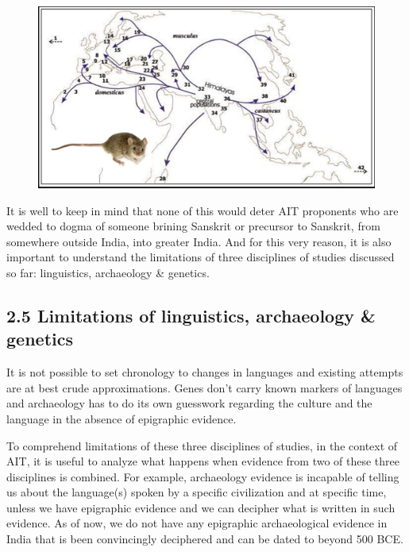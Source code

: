 \begin{figure}[!htbp]
\includegraphics[scale=0.22]{"images/8-11.jpg"}
\caption{}\label{art8-fig11}
\end{figure}

\newpage

It is well to keep in mind that none of this would deter AIT proponents who are wedded to dogma of someone brining Sanskrit or precursor to Sanskrit, from somewhere outside India, into greater India. And for this very reason, it is also important to understand the limitations of three disciplines of studies discussed so far: linguistics, archaeology \& genetics.


\subsection*{2.5 Limitations of linguistics, archaeology \& genetics}

It is not possible to set chronology to changes in languages and existing attempts are at best crude approximations. Genes don’t carry known markers of languages and archaeology has to do its own guesswork regarding the culture and the language in the absence of epigraphic evidence.

To comprehend limitations of these three disciplines of studies, in the context of AIT, it is useful to analyze what happens when evidence from two of these three disciplines is combined. For example, archaeology evidence is incapable of telling us about the language(s) spoken by a specific civilization and at specific time, unless we have epigraphic evidence and we can decipher what is written in such evidence. As of now, we do not have any epigraphic archaeological evidence in India that is been convincingly deciphered and can be dated to beyond 500 BCE.

\newpage

